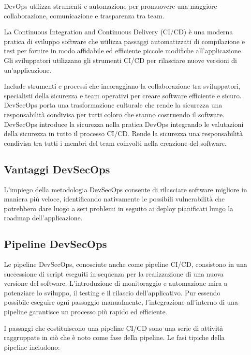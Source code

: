 DevOps utilizza strumenti e automazione per promuovere una maggiore collaborazione, comunicazione e trasparenza tra team.

La Continuous Integration and Continuous Delivery (CI/CD) è una moderna pratica di sviluppo software che utilizza passaggi automatizzati di compilazione e test per fornire in modo affidabile ed efficiente piccole modifiche all'applicazione. Gli sviluppatori utilizzano gli strumenti CI/CD per rilasciare nuove versioni di un'applicazione.

Include strumenti e processi che incoraggiano la collaborazione tra sviluppatori, specialisti della sicurezza e team operativi per creare software efficiente e sicuro. DevSecOps porta una trasformazione culturale che rende la sicurezza una responsabilità condivisa per tutti coloro che stanno costruendo il software. DevSecOps introduce la sicurezza nella pratica DevOps integrando le valutazioni della sicurezza in tutto il processo CI/CD. Rende la sicurezza una responsabilità condivisa tra tutti i membri del team coinvolti nella creazione del software.
\cite{DevSecOps}
\cite{DevSecOps2}
\subsection{Vantaggi DevSecOps}
L’impiego della metodologia DevSecOps consente di rilasciare software migliore in maniera più veloce, identificando nativamente le possibili vulnerabilità che potrebbero dare luogo a seri problemi in seguito ai deploy pianificati lungo la roadmap dell’applicazione.
\subsection{Pipeline DevSecOps} 
Le pipeline DevSecOps, conosciute anche come pipeline CI/CD, consistono in una successione di script eseguiti in sequenza per la realizzazione di una nuova versione del software. L'introduzione di monitoraggio e automazione mira a potenziare lo sviluppo, il testing e il rilascio dell'applicativo. Pur essendo possibile eseguire ogni passaggio manualmente, l'integrazione all'interno di una pipeline garantisce un processo più rapido ed efficiente.

I passaggi che costituiscono una pipeline CI/CD sono una serie di attività raggruppate in ciò che è noto come fase della pipeline. Le fasi tipiche della pipeline includono:

